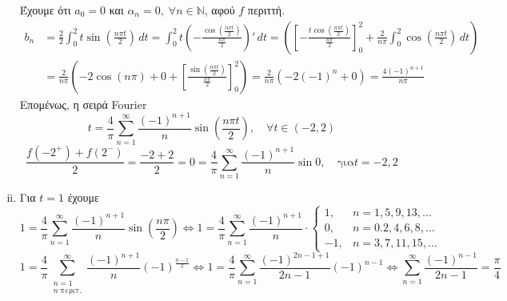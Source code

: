 \begin{solution}
\begin{enumerate}[i)]
      Έχουμε ότι $ a_{0}=0 $ και $α_{n}=0, \; \forall n \in \mathbb{N} $, 
      αφού $f$ περιττή.  
      \begin{align*}
        b_{n} &= \frac{2}{2} \int _{0}^{2} t \sin{\left(\frac{n \pi t}{2}\right)}
        \,{dt} = \int _{0}^{2} t \left(-
        \frac{\cos{(\frac{n \pi t}{2})}}{\frac{n \pi}{2}}\right)' \,{dt} =
        \left(\left[- \frac{t \cos{(\frac{n \pi t}{2})}}{\frac{n \pi}{2}}
          \right]_{0}^{2} + \frac{2}{n \pi}\int _{0}^{2}
        \cos{\left(\frac{n \pi t}{2}\right)} \,{dt}\right) \\
              &= \frac{2}{n \pi} \left( -2 \cos{(n \pi)} + 0 + 
                \left[\frac{\sin{(\frac{n \pi t}{2})}}{\frac{n \pi}{2}}
              \right]_{0}^{2}\right) = \frac{2}{n \pi} \left(-2 (-1)^{n} + 0\right) = 
              \frac{4 (-1)^{n+1}}{n \pi} 
      \end{align*}
      Επομένως, η σειρά Fourier
      \[
        t = \frac{4}{\pi} \sum_{n=1}^{\infty} \frac{(-1)^{n+1}}{n} \sin{\left(\frac{n \pi t}{2}\right)}, 
        \quad \forall t \in (-2,2)
      \] 
      \[
        \frac{f(-2^{+})+ f(2^{-})}{2} = \frac{-2 + 2}{2} = 0 = \frac{4}{\pi}
        \sum_{n=1}^{\infty} \frac{(-1)^{n+1}}{n} \sin{0}, \quad \text{για} t = -2,2
      \] 
    \item 
      Για $ t=1 $ έχουμε
      \[
        1 = \frac{4}{\pi} \sum_{n=1}^{\infty} \frac{(-1)^{n+1}}{n}\sin{\left( \frac{n
        \pi}{2} \right)} \Leftrightarrow 
        1 = \frac{4}{\pi} \sum_{n=1}^{\infty} \frac{(-1)^{n+1}}{n} \cdot 
        \begin{cases}
          1, & n=1,5,9,13,\ldots \\
          0, &n=0.2,4,6,8,\ldots \\
          -1, & n=3,7,11,15,\ldots 
        \end{cases}
      \] 
      \[
        1 = \frac{4}{\pi} \sum_{\substack{n=1 \\ n \; \text{περιτ.}}}^{\infty} 
        \frac{(-1)^{n+1}}{n} (-1)^{\frac{n-1}{2}} \Leftrightarrow 1 = \frac{4}{\pi}
        \sum_{n=1}^{\infty} \frac{(-1)^{2n-1+1}}{2n-1} (-1)^{n-1}
        \Leftrightarrow 
        \sum_{n=1}^{\infty} \frac{(-1)^{n-1}}{2n-1} = \frac{\pi}{4}
      \] 
  \end{enumerate}
\end{solution}

